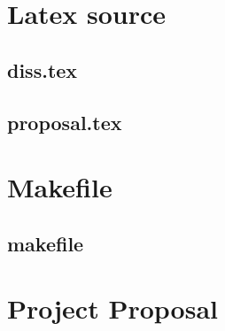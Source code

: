 \documentclass[12pt,a4paper,twoside,openright]{report}
\begin{document}




\appendix

\chapter{Latex source}

\section{diss.tex}
{\scriptsize}

\section{proposal.tex}
{\scriptsize}

\chapter{Makefile}

\section{makefile}\label{makefile}



\chapter{Project Proposal}

%
\end{document}

